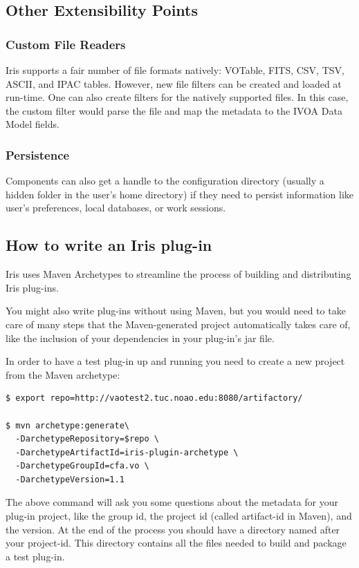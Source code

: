 \documentclass[preprint,authoryear,5p]{elsarticle}
\begin{document}
\subsection{Other Extensibility Points}

\subsubsection{Custom File Readers} Iris supports a fair number of file formats
natively: VOTable, FITS, CSV, TSV, ASCII, and IPAC tables. However, new file
filters can be created and loaded at run-time. One can also create filters for
the natively supported files. In this case, the custom filter would parse the
file and map the metadata to the IVOA Data Model fields.

\subsubsection{Persistence} Components can also get a handle to the
configuration directory (usually a hidden folder in the user's home directory)
if they need to persist information like user's preferences, local databases, or
work sessions.



\subsection{How to write an Iris plug-in} \label{sec:writeplugin} Iris uses Maven
Archetypes to streamline the process of building and distributing Iris plug-ins.

You might also write plug-ins without using Maven, but you would need to take
care of many steps that the Maven-generated project automatically takes care of,
like the inclusion of your dependencies in your plug-in's jar file.

In order to have a test plug-in up and running you need to create a new project
from the Maven archetype:

\begin{lstlisting}[style=code]
$ export repo=http://vaotest2.tuc.noao.edu:8080/artifactory/

$ mvn archetype:generate\
  -DarchetypeRepository=$repo \
  -DarchetypeArtifactId=iris-plugin-archetype \
  -DarchetypeGroupId=cfa.vo \
  -DarchetypeVersion=1.1
\end{lstlisting}

The above command will ask you some questions about the metadata for your
plug-in project, like the group id, the project id (called artifact-id in
Maven), and the version. At the end of the process you should have a directory
named after your project-id. This directory contains all the files needed to
build and package a test plug-in.
\end{document}
